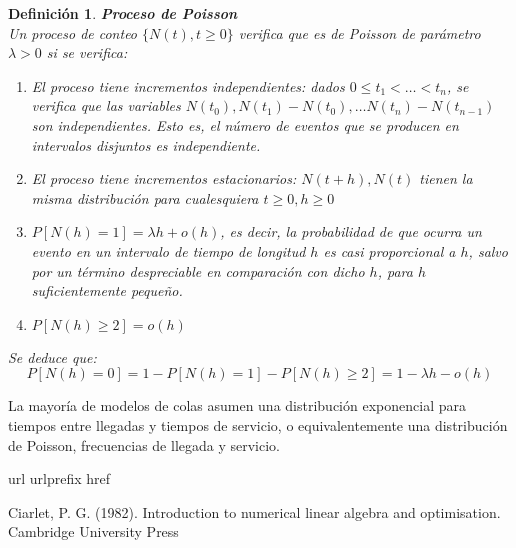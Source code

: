 \documentclass[a4paper,10pt]{scrartcl}
\newtheorem{mydefn}{Definición}
\numberwithin{equation}{section}
\begin{document}
  \begin{mydefn} \textbf{Proceso de Poisson}\\
  Un proceso de conteo $\{N(t), t\ge 0\}$ verifica que es de Poisson de parámetro $\lambda > 0$ si se verifica:
  
  \begin{enumerate}
    \item El proceso tiene incrementos independientes: dados $0 \le t_1 < \ldots < t_n$, se verifica que
    las variables $N(t_0), N(t_1) - N(t_0), \ldots N(t_n)- N(t_{n-1})$ son independientes. Esto es, el número de eventos
    que se producen en intervalos disjuntos es independiente.
    \item El proceso tiene incrementos estacionarios: $N(t+h), N(t)$ tienen la misma distribución para cualesquiera
    $t\ge 0, h\ge 0$
    \item $P[N(h) = 1] = \lambda h + o(h)$, es decir, la probabilidad de que ocurra un evento en un intervalo de
    tiempo de longitud $h$ es casi proporcional a $h$, salvo por un término despreciable en comparación con dicho $h$, para
    $h$ suficientemente pequeño.
    \item $P[N(h) \ge 2] = o(h)$
  \end{enumerate}

  Se deduce que: 
  \[P[N(h) = 0] = 1 - P[N(h)=1] - P[N(h) \ge 2] = 1 -\lambda h - o(h)\]
  \end{mydefn}


La mayoría de modelos de colas asumen una distribución exponencial para tiempos entre llegadas y tiempos 
de servicio, o equivalentemente una distribución de Poisson, frecuencias de llegada y servicio.








\newpage
\begin{thebibliography}{10}
  \expandafter\ifx\csname url\endcsname\relax
  \def\url#1{\texttt{#1}}\fi
  \expandafter\ifx\csname urlprefix\endcsname\relax\def\urlprefix{URL }\fi
  \expandafter\ifx\csname href\endcsname\relax
  \def\href#1#2{#2} \def\path#1{#1}\fi

  Ciarlet, P. G. (1982).
  Introduction to numerical linear algebra and optimisation.
  Cambridge University Press

\end{thebibliography}
\end{document}
